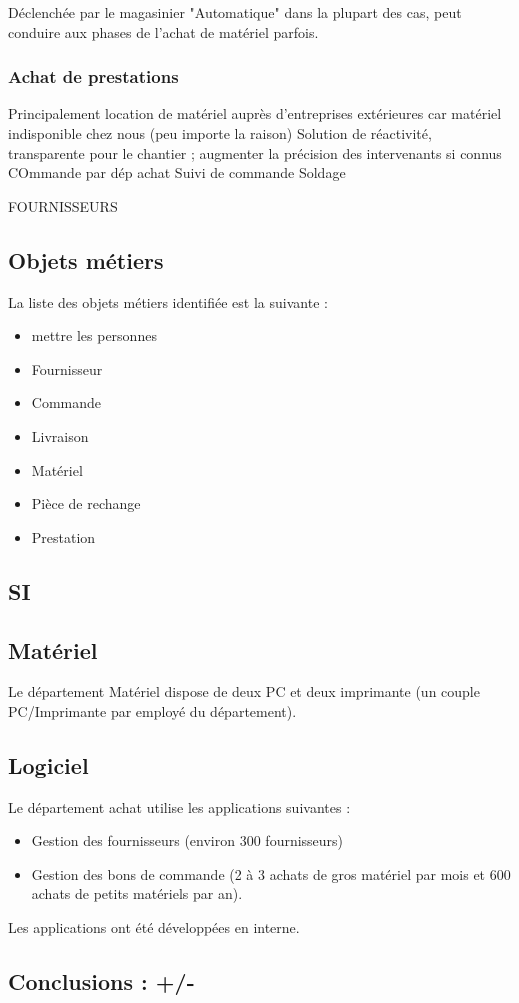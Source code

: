 \documentclass[a4paper]{article}
\begin{document}
Déclenchée par le magasinier
"Automatique" dans la plupart des cas, peut conduire aux phases de l'achat
de matériel parfois.


\subsubsection{Achat de prestations}

Principalement location de matériel auprès d'entreprises extérieures car
matériel indisponible chez nous (peu importe la raison)
Solution de réactivité, transparente pour le chantier ; augmenter la
précision des intervenants si connus
COmmande par dép achat
Suivi de commande
Soldage


FOURNISSEURS


\subsection{Objets métiers}

La liste des objets métiers identifiée est la suivante :

\begin{itemize}
\item mettre les personnes
\item Fournisseur
\item Commande
\item Livraison
\item Matériel
\item Pièce de rechange
\item Prestation
\end{itemize}


\subsection{SI}

\subsection{Matériel}
Le département Matériel dispose de deux PC et deux imprimante (un couple
PC/Imprimante par employé du département).

\subsection{Logiciel}
Le département achat utilise les applications suivantes :
\begin{itemize}
\item Gestion des fournisseurs (environ 300 fournisseurs)
\item Gestion des bons de commande (2 à 3 achats de gros matériel par mois
et 600 achats de petits matériels par an).
\end{itemize}

Les applications ont été développées en interne.


\subsection{Conclusions : +/-}
\end{document}
